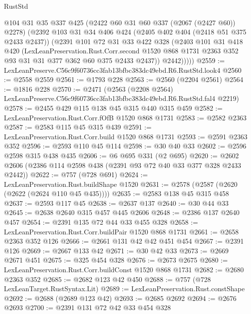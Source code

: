 \begin{lexlean}{RustStd}
\begin{coremodule}
          @104
          @31
          @35
          @337
          @425
          (@2422 @60 @31 @60 @337 (@2067 (@2427 @60)) @2278)
          (@2392
            @103
            @31
            @34
            @406
            @424
            (@2405 @402 @404 (@2418 @51 @375 @2433 @2437))
            (@2391
              @101
              @72
              @31
              @33
              @422
              @328
              (@2403
                @101
                @31
                @418
                @420
                (LexLeanPreservation.Rust.Corr.second
                  @1520
                  @868
                  @1731
                  @2363
                  @352
                  @93
                  @31
                  @31
                  @377
                  @362
                  @60
                  @375
                  @2433
                  @2437))
              @2442)))))
@2559 := LexLeanPreserve.C56c9f60736cc3fab13bfbc383dc49ebd.R6.RustStd.look4
@2560 := @2558 @2559
@2561 := @1793 @228
@2563 := @2560 (@2204 @2561)
@2564 := @1816 @228
@2570 := @2471
    (@2563 (@2208 @2564) LexLeanPreserve.C56c9f60736cc3fab13bfbc383dc49ebd.R6.RustStd.fal4 @2219)
@2578 := @2455 @429 @115 @138 @45 @315 @440 @315 @459
@2582 := LexLeanPreservation.Rust.Corr.fOfB @1520 @868 @1731
@2583 := @2582 @2363
@2587 := @2583 @115 @45 @315 @439
@2591 := LexLeanPreservation.Rust.Corr.build @1520 @868 @1731
@2593 := @2591 @2363 @352
@2596 := @2593 @110 @45 @114
@2598 := @30 @40 @33
@2602 := @2596 @2598 @315 @438 @435
@2606 := @6 @695 @331 (@2 @695)
@2620 := @2602 @2606 (@2386 @114 @2598 @438 (@2391 @93 @72 @40 @33 @377 @328 @2433 @2442))
@2622 := @757 (@728 @691)
@2624 := LexLeanPreservation.Rust.buildShape @1520
@2631 := @2578 (@2587 (@2620 (@2622 (@2624 @110 @45 @435))))
@2635 := @2583 @138 @45 @315 @458
@2637 := @2593 @117 @45
@2638 := @2637 @137
@2640 := @30 @44 @33
@2645 := @2638 @2640 @315 @457 @445 @2606
@2648 := @2386 @137 @2640 @457
@2654 := @2391 @135 @72 @44 @33 @455 @328
@2658 := LexLeanPreservation.Rust.Corr.buildPair @1520 @868 @1731
@2661 := @2658 @2363 @352 @126
@2666 := @2661 @131 @42 @42 @451 @454
@2667 := @2391 @126
@2669 := @2667 @133 @42
@2671 := @30 @42 @33
@2673 := @2669 @2671 @451
@2675 := @325 @454 @328
@2676 := @2673 @2675
@2680 := LexLeanPreservation.Rust.Corr.buildConst @1520 @868 @1731
@2682 := @2680 @2363 @352
@2685 := @2682 @123 @42 @450
@2688 := @757 (@728 LexLeanTarget.RustSyntax.Lit)
@2689 := LexLeanPreservation.Rust.constShape
@2692 := @2688 (@2689 @123 @42)
@2693 := @2685 @2692
@2694 := @2676 @2693
@2700 := @2391 @131 @72 @42 @33 @454 @328

\end{coremodule}
\end{lexlean}
